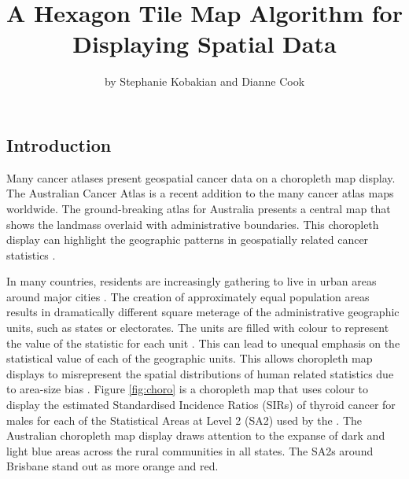 \title{A Hexagon Tile Map Algorithm for Displaying Spatial Data}
\author{by Stephanie Kobakian and Dianne Cook}

\maketitle


\hypertarget{introduction}{%
\subsection{Introduction}\label{introduction}}

Many cancer atlases present geospatial cancer data on a choropleth map
display. The Australian Cancer Atlas \citep{TACA} is a recent addition
to the many cancer atlas maps worldwide. The ground-breaking atlas for
Australia presents a central map that shows the landmass overlaid with
administrative boundaries. This choropleth display can highlight the
geographic patterns in geospatially related cancer statistics
\citep{SAMGIS}.

In many countries, residents are increasingly gathering to live in urban
areas around major cities \citep{ACTUC}. The creation of approximately
equal population areas results in dramatically different square meterage
of the administrative geographic units, such as states or electorates.
The units are filled with colour to represent the value of the statistic
for each unit \citep{EI}. This can lead to unequal emphasis on the
statistical value of each of the geographic units. This allows
choropleth map displays to misrepresent the spatial distributions of
human related statistics due to area-size bias \citep{BCM}. Figure
\ref{fig:choro} is a choropleth map that uses colour to display the
estimated Standardised Incidence Ratios (SIRs) of thyroid cancer for
males for each of the Statistical Areas at Level 2 (SA2) used by the
\citet{abs2011}. The Australian choropleth map display draws attention
to the expanse of dark and light blue areas across the rural communities
in all states. The SA2s around Brisbane stand out as more orange and
red.

